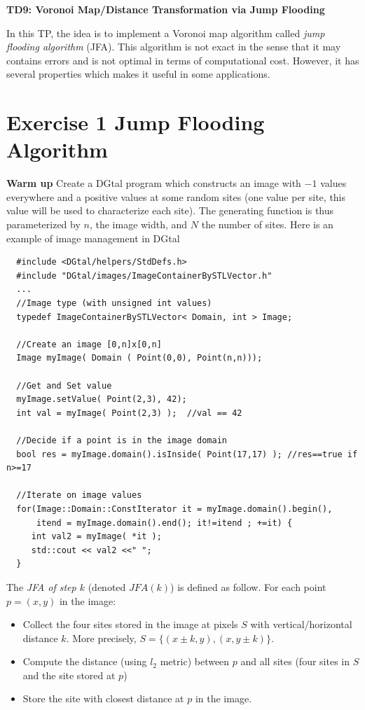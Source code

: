 \documentclass[a4paper, 11pt]{article}
\title{}
\author{}
\date{}
\begin{document}
\begin{center}
	\LARGE \textbf{TD9: Voronoi Map/Distance Transformation via Jump Flooding}
\end{center}

\bigskip
\par In this TP, the idea is to implement a Voronoi map algorithm called \emph{jump flooding algorithm} (JFA). This algorithm is not exact in the sense that it may contains errors and is not optimal in terms of computational cost. However, it has several properties which makes it useful in some applications.



\section*{Exercise 1 \rm Jump Flooding Algorithm}

{\bf Warm up} Create a DGtal program which constructs an image with $-1$  values everywhere and a positive  values at some random sites (one value per site, this value will be used to characterize each site). The generating function is thus parameterized by $n$, the image width, and $N$ the number of sites. Here is an example of image management in DGtal
\begin{verbatim}
  #include <DGtal/helpers/StdDefs.h>
  #include "DGtal/images/ImageContainerBySTLVector.h"
  ...
  //Image type (with unsigned int values)
  typedef ImageContainerBySTLVector< Domain, int > Image;
  
  //Create an image [0,n]x[0,n]
  Image myImage( Domain ( Point(0,0), Point(n,n)));
 
  //Get and Set value
  myImage.setValue( Point(2,3), 42);
  int val = myImage( Point(2,3) );  //val == 42

  //Decide if a point is in the image domain
  bool res = myImage.domain().isInside( Point(17,17) ); //res==true if n>=17

  //Iterate on image values
  for(Image::Domain::ConstIterator it = myImage.domain().begin(), 
      itend = myImage.domain().end(); it!=itend ; +=it) {
     int val2 = myImage( *it );
     std::cout << val2 <<" "; 
  }
\end{verbatim}


\par The \emph{JFA of step $k$} (denoted $JFA(k)$) is defined as follow. For each point $p=(x,y)$ in the image:
	\begin{itemize}
	\item Collect the four sites stored in the image at pixels $S$ with vertical/horizontal distance $k$. More precisely, $S=\{ (x \pm k, y), (x, y\pm k)\}$.
	\item Compute the distance (using $l_2$ metric) between $p$ and all sites (four sites in $S$ and the site stored at $p$)
	\item Store the site with closest distance at $p$ in the image.
	\end{itemize}
	
\end{document}
